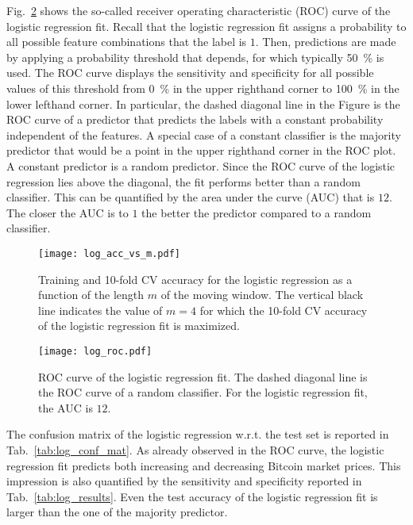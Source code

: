 Fig.~\ref{fig:log_roc} shows the so-called receiver operating characteristic (ROC) curve of the logistic regression fit. Recall that the logistic regression fit assigns a probability to all possible feature combinations that the label is $1$. Then, predictions are made by applying a probability threshold that depends, for which typically \SI{50}{\percent} is used. The ROC curve displays the sensitivity and specificity for all possible values of this threshold from \SI{0}{\percent} in the upper righthand corner to \SI{100}{\percent} in the lower lefthand corner. In particular, the dashed diagonal line in the Figure is the ROC curve of a predictor that predicts the labels with a constant probability independent of the features. A special case of a constant classifier is the majority predictor that would be a point in the upper righthand corner in the ROC plot. A constant predictor is a random predictor. Since the ROC curve of the logistic regression lies above the diagonal, the fit performs better than a random classifier. This can be quantified by the area under the curve (AUC) that is $12$. The closer the AUC is to $1$ the better the predictor compared to a random classifier.

\begin{figure}[h!]
  \centering
  \texttt{[image: log\_acc\_vs\_m.pdf]}
  \caption{Training and 10-fold CV accuracy for the logistic regression as a function of the length $m$ of the moving window. The vertical black line indicates the value of $m=4$ for which the 10-fold CV accuracy of the logistic regression fit is maximized.}
  \label{fig:log_acc_vs_m}
\end{figure}

\begin{figure}[h!]
  \centering
  \texttt{[image: log\_roc.pdf]}
  \caption{ROC curve of the logistic regression fit. The dashed diagonal line is the ROC curve of a random classifier. For the logistic regression fit, the AUC is $12$.}
  \label{fig:log_roc}
\end{figure}

The confusion matrix of the logistic regression w.r.t. the test set is reported in Tab.~\ref{tab:log_conf_mat}. As already observed in the ROC curve, the logistic regression fit predicts both increasing and decreasing Bitcoin market prices. This impression is also quantified by the sensitivity and specificity reported in Tab.~\ref{tab:log_results}. Even the test accuracy of the logistic regression fit is larger than the one of the majority predictor.

